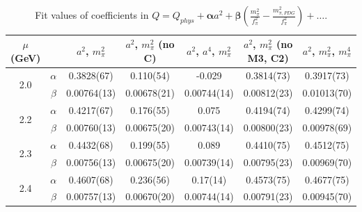 \documentclass[12pt]{extarticle}
\begin{document}
\begin{table}[h!]
\begin{center}
\begin{tabular}{|c c|c|c|c|c|c|}
\hline
$\mu$ (GeV) &  & $a^2$, $m_\pi^2$& $a^2$, $m_\pi^2$ (no C)& $a^2$, $a^4$, $m_\pi^2$& $a^2$, $m_\pi^2$ (no M3, C2)& $a^2$, $m_\pi^2$, $m_\pi^4$\\
\hline
\multirow{2}{0.5in}{2.0} & $\alpha$ & 0.3828(67)& 0.110(54)& -0.029& 0.3814(73)& 0.3917(73)\\
 & $\beta$ & 0.00764(13)& 0.00678(21)& 0.00744(14)& 0.00812(23)& 0.01013(70)\\
\hline
\multirow{2}{0.5in}{2.2} & $\alpha$ & 0.4217(67)& 0.176(55)& 0.075& 0.4194(74)& 0.4299(74)\\
 & $\beta$ & 0.00760(13)& 0.00675(20)& 0.00743(14)& 0.00800(23)& 0.00978(69)\\
\hline
\multirow{2}{0.5in}{2.3} & $\alpha$ & 0.4432(68)& 0.199(55)& 0.089& 0.4410(75)& 0.4512(75)\\
 & $\beta$ & 0.00756(13)& 0.00675(20)& 0.00739(14)& 0.00795(23)& 0.00969(70)\\
\hline
\multirow{2}{0.5in}{2.4} & $\alpha$ & 0.4607(68)& 0.236(56)& 0.17(14)& 0.4573(75)& 0.4677(75)\\
 & $\beta$ & 0.00757(13)& 0.00670(20)& 0.00744(14)& 0.00791(23)& 0.00945(70)\\
\hline
\end{tabular}
\caption{Fit values of coefficients in $Q = Q_{phys} + \mathbf{\alpha} a^2 + \mathbf{\beta}\left(\frac{m_\pi^2}{f_\pi^2}-\frac{m_{\pi,PDG}^2}{f_\pi^2}\right) + \ldots$.}
\end{center}
\end{table}




















\clearpage
\end{document}
